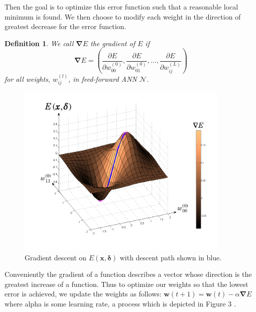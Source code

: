 \documentclass{ib-assignment}
\newtheorem{definition}{Definition}[section]
\begin{document}
Then the goal is to optimize this error function such that a reasonable local minimum is found. We then choose to modify each weight in the direction of greatest decrease for the error function. 
\begin{definition}
We call \(\pmb{\nabla}E\) the gradient of \(E\) if 
\[\pmb{\nabla}E = \left(\frac{\partial E}{\partial w_{00}^{(0)}}, 
\frac{\partial E}{\partial w_{01}^{(0)}},\dots,
\frac{\partial E}{\partial w_{ij}^{(L)}}\right)\]
for all weights, \(w_{ij}^{(l)}\), in feed-forward ANN \(\mathcal{N}\).
\end{definition}
\begin{figure}
\centering
 \includegraphics[width=4in]{gradient_descent}
 \caption{Gradient descent on \(E\left(\pmb{x}, \pmb{\delta}\right)\) with descent path shown in blue.}
\end{figure}
Conveniently the gradient of a function describes a vector whose direction is the greatest increase of a function. Thus to optimize our weights so that the lowest error is achieved, we update the weights as follows: \(\pmb{w}(t+1) = \pmb{w}(t)-\alpha \pmb{\nabla}E\) where alpha is some learning rate, a process which is depicted in Figure 3 \cite{rumelhart1988learning}.
\end{document}
